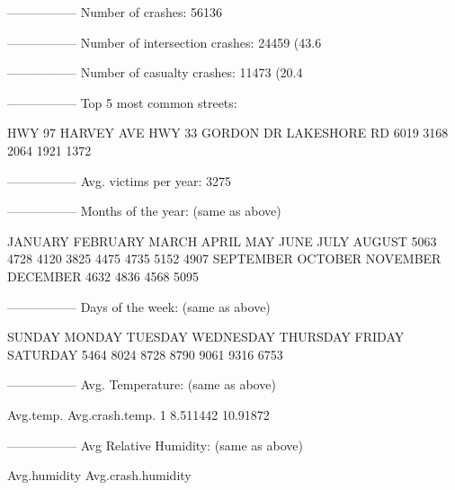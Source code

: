 \documentclass[11pt, a4paper]{article}
\begin{document}
\begin{Schunk}
\begin{Soutput}
-----------------
Number of crashes: 56136
\end{Soutput}
\begin{Soutput}
-----------------
Number of intersection crashes: 24459 (43.6%
\end{Soutput}
\begin{Soutput}
-----------------
Number of casualty crashes: 11473 (20.4%
\end{Soutput}
\begin{Soutput}
-----------------
Top 5 most common streets:
\end{Soutput}
\begin{Soutput}
      HWY 97   HARVEY AVE       HWY 33    GORDON DR LAKESHORE RD 
        6019         3168         2064         1921         1372 
\end{Soutput}
\begin{Soutput}
-----------------
Avg. victims per year: 3275
\end{Soutput}
\begin{Soutput}
-----------------
Months of the year: (same as above)
\end{Soutput}
\begin{Soutput}
  JANUARY  FEBRUARY     MARCH     APRIL       MAY      JUNE      JULY    AUGUST 
     5063      4728      4120      3825      4475      4735      5152      4907 
SEPTEMBER   OCTOBER  NOVEMBER  DECEMBER 
     4632      4836      4568      5095 
\end{Soutput}
\begin{Soutput}
-----------------
Days of the week: (same as above)
\end{Soutput}
\begin{Soutput}
   SUNDAY    MONDAY   TUESDAY WEDNESDAY  THURSDAY    FRIDAY  SATURDAY 
     5464      8024      8728      8790      9061      9316      6753 
\end{Soutput}
\begin{Soutput}
-----------------
Avg. Temperature: (same as above)
\end{Soutput}
\begin{Soutput}
  Avg.temp. Avg.crash.temp.
1  8.511442        10.91872
\end{Soutput}
\begin{Soutput}
-----------------
Avg Relative Humidity: (same as above)
\end{Soutput}
\begin{Soutput}
  Avg.humidity Avg.crash.humidity

\end{Soutput}
\end{Schunk}
\end{document}
